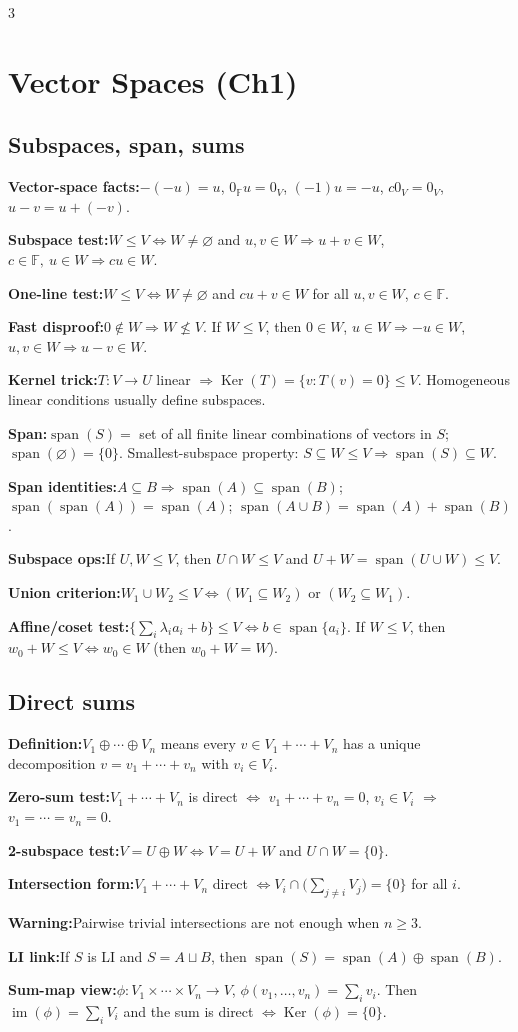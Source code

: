 \documentclass[10pt]{article}
\newcommand{\F}{\mathbb{F}}
\newcommand{\Ker}{\operatorname{Ker}}
\newcommand{\im}{\operatorname{im}}
\newcommand{\spann}{\operatorname{span}}
\newenvironment{cheatitems}{\par\vspace{-1pt}}{\par\vspace{-1pt}}
\newcommand{\cheatrow}[2]{%
  \par\noindent\textbf{#1:}\nobreak\enspace #2\par
}
\begin{document}
\begin{multicols}{3}
\fontsize{7.7pt}{7.95pt}\selectfont

\section*{Vector Spaces (Ch1)}

\subsection*{Subspaces, span, sums}
\begin{cheatitems}
\cheatrow{Vector-space facts}{$-(-u)=u$, $0_{\F}u=0_V$, $(-1)u=-u$, $c0_V=0_V$, $u-v=u+(-v)$.}
\cheatrow{Subspace test}{$W\le V \iff W\neq\varnothing$ and $u,v\in W\Rightarrow u+v\in W$, $c\in\F,\ u\in W\Rightarrow cu\in W$.}
\cheatrow{One-line test}{$W\le V \iff W\neq\varnothing$ and $cu+v\in W$ for all $u,v\in W$, $c\in\F$.}
\cheatrow{Fast disproof}{$0\notin W\Rightarrow W\not\le V$. If $W\le V$, then $0\in W$, $u\in W\Rightarrow -u\in W$, $u,v\in W\Rightarrow u-v\in W$.}
\cheatrow{Kernel trick}{$T:V\to U$ linear $\Rightarrow \Ker(T)=\{v:T(v)=0\}\le V$. Homogeneous linear conditions usually define subspaces.}
\cheatrow{Span}{$\spann(S)=$ set of all finite linear combinations of vectors in $S$; $\spann(\varnothing)=\{0\}$. Smallest-subspace property: $S\subseteq W\le V\Rightarrow \spann(S)\subseteq W$.}
\cheatrow{Span identities}{$A\subseteq B\Rightarrow \spann(A)\subseteq\spann(B)$; $\spann(\spann(A))=\spann(A)$; $\spann(A\cup B)=\spann(A)+\spann(B)$.}
\cheatrow{Subspace ops}{If $U,W\le V$, then $U\cap W\le V$ and $U+W=\spann(U\cup W)\le V$.}
\cheatrow{Union criterion}{$W_1\cup W_2\le V \iff (W_1\subseteq W_2)$ or $(W_2\subseteq W_1)$.}
\cheatrow{Affine/coset test}{$\{\sum_i\lambda_i a_i+b\}\le V \iff b\in\spann\{a_i\}$. If $W\le V$, then $w_0+W\le V \iff w_0\in W$ (then $w_0+W=W$).}
\end{cheatitems}

\subsection*{Direct sums}
\begin{cheatitems}
\cheatrow{Definition}{$V_1\oplus\cdots\oplus V_n$ means every $v\in V_1+\cdots+V_n$ has a unique decomposition $v=v_1+\cdots+v_n$ with $v_i\in V_i$.}
\cheatrow{Zero-sum test}{$V_1+\cdots+V_n$ is direct $\iff$ $v_1+\cdots+v_n=0$, $v_i\in V_i$ $\Rightarrow$ $v_1=\cdots=v_n=0$.}
\cheatrow{2-subspace test}{$V=U\oplus W \iff V=U+W$ and $U\cap W=\{0\}$.}
\cheatrow{Intersection form}{$V_1+\cdots+V_n$ direct $\iff V_i\cap\bigl(\sum_{j\ne i}V_j\bigr)=\{0\}$ for all $i$.}
\cheatrow{Warning}{Pairwise trivial intersections are not enough when $n\ge 3$.}
\cheatrow{LI link}{If $S$ is LI and $S=A\sqcup B$, then $\spann(S)=\spann(A)\oplus\spann(B)$.}
\cheatrow{Sum-map view}{$\phi:V_1\times\cdots\times V_n\to V$, $\phi(v_1,\dots,v_n)=\sum_i v_i$. Then $\im(\phi)=\sum_iV_i$ and the sum is direct $\iff \Ker(\phi)=\{0\}$.}
\end{cheatitems}


\end{multicols}
\end{document}
